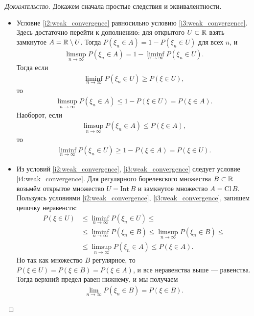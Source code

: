 \documentclass[../main.tex]{subfiles}
\begin{document}
\begin{proof}[\normalfont\textsc{Доказательство}]
 Докажем сначала простые следствия и эквивалентности.
 \begin{itemize}
  \item Условие \ref{i2:weak_convergence} равносильно условию \ref{i3:weak_convergence}. Здесь достаточно перейти к дополнению: для открытого $ U \subset \mathbb{R}$ взять замкнутое $ A = \mathbb{R} \setminus U $. Тогда $ P(\xi_n \in A) = 1 - P(\xi_n \in U) $ для всех $ n $, и
   \begin{align*}
    \limsup_{n \to \infty} P(\xi_n \in A) = 1 - \liminf_{n \to \infty} P(\xi_n \in U).
   \end{align*} Тогда если
   \begin{align*}
    \liminf_{n \to \infty} P(\xi_n \in U) \geqslant P(\xi \in U),
   \end{align*} то
   \begin{align*}
    \limsup_{n \to \infty} P(\xi_n\in A) \leqslant 1 - P(\xi \in U) = P(\xi\in A).
   \end{align*} Наоборот, если
   \begin{align*}
    \limsup_{n \to \infty} P(\xi_n \in A) \leqslant P(\xi \in A),
   \end{align*} то
   \begin{align*}
    \liminf_{n \to \infty} P(\xi_n \in U) \geqslant 1 - P(\xi \in A) = P(\xi \in U).
   \end{align*}

  \item Из условий \ref{i2:weak_convergence}, \ref{i3:weak_convergence} следует условие \ref{i4:weak_convergence}. Для регулярного борелевского множества $ B \subset \mathbb{R} $ возьмём открытое множество $ U = \mathrm{Int}\,B $ и замкнутое множество $ A =\mathrm{Cl}\,B $. Пользуясь условиями \ref{i2:weak_convergence}, \ref{i3:weak_convergence}, запишем цепочку неравенств:
   \begin{align*}
    P(\xi \in U) &\leqslant \liminf_{n \to \infty} P(\xi_n \in U) \leqslant \\
    &\leqslant \liminf_{n \to \infty} P(\xi_n \in B) \leqslant \limsup_{n \to \infty} P(\xi_n \in B) \leqslant \\
    &\leqslant \limsup_{n \to \infty} P(\xi_n \in A) \leqslant P(\xi \in A).
   \end{align*} Но так как множество $ B $ регулярное, то $ P(\xi\in U) = P(\xi\in B) = P(\xi\in A) $, и все неравенства выше --- равенства. Тогда верхний предел равен нижнему, и мы получаем
   \begin{align*}
    \lim_{n \to \infty} P(\xi_n \in B) = P(\xi\in B).
   \end{align*}


\end{itemize}
\end{proof}
\end{document}
